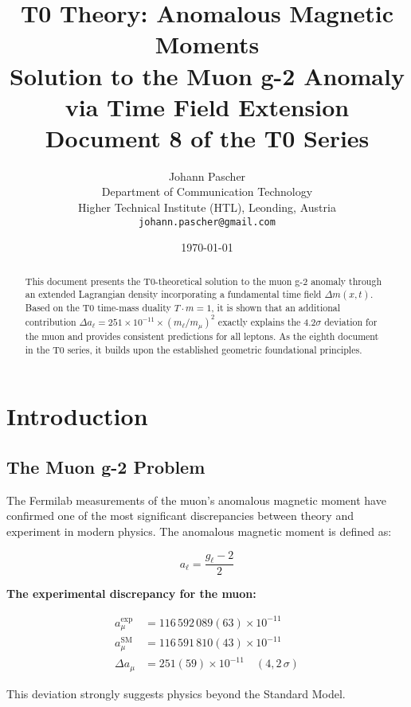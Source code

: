 \documentclass[12pt,a4paper]{article}
\title{\textbf{T0 Theory: Anomalous Magnetic Moments}\\[0.5cm]
	\large Solution to the Muon g-2 Anomaly via Time Field Extension\\[0.3cm]
	\normalsize Document 8 of the T0 Series}
\author{Johann Pascher\\
	Department of Communication Technology\\
	Higher Technical Institute (HTL), Leonding, Austria\\
	\texttt{johann.pascher@gmail.com}}
\date{\today}
\newcommand{\Deltam}{\Delta m}
\begin{document}
	
	\maketitle
	
	\begin{abstract}
		This document presents the T0-theoretical solution to the muon g-2 anomaly through an extended Lagrangian density incorporating a fundamental time field $\Deltam(x,t)$. Based on the T0 time-mass duality $T \cdot m = 1$, it is shown that an additional contribution $\Delta a_\ell = 251 \times 10^{-11} \times (m_\ell/m_\mu)^2$ exactly explains the 4.2$\sigma$ deviation for the muon and provides consistent predictions for all leptons. As the eighth document in the T0 series, it builds upon the established geometric foundational principles.
	\end{abstract}
	
	\tableofcontents
	\newpage
	
	\section{Introduction}
	
	\subsection{The Muon g-2 Problem}
	
	The Fermilab measurements of the muon's anomalous magnetic moment have confirmed one of the most significant discrepancies between theory and experiment in modern physics. The anomalous magnetic moment is defined as:
	
	\begin{equation}
		a_\ell = \frac{g_\ell - 2}{2}
	\end{equation}
	
	\begin{keyresult}
		\textbf{The experimental discrepancy for the muon:}
		
		\begin{align}
			a_\mu^{\text{exp}} &= 116\,592\,089(63) \times 10^{-11}\\
			a_\mu^{\text{SM}} &= 116\,591\,810(43) \times 10^{-11}\\
			\Delta a_\mu &= 251(59) \times 10^{-11} \quad (4,2\,\sigma)
		\end{align}
		
		This deviation strongly suggests physics beyond the Standard Model.
	\end{keyresult}
	
\end{document}

